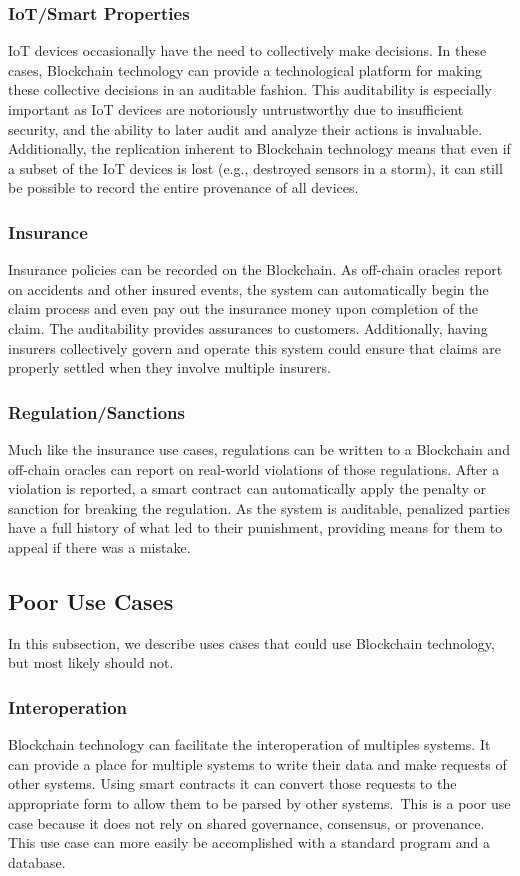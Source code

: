 \subsubsection{IoT/Smart Properties}
IoT devices occasionally have the need to collectively make decisions.
In these cases, Blockchain technology can provide a technological platform for making these collective decisions in an auditable fashion.
This auditability is especially important as IoT devices are notoriously untrustworthy due to insufficient security, and the ability to later audit and analyze their actions is invaluable.
Additionally, the replication inherent to Blockchain technology means that even if a subset of the IoT devices is lost (e.g., destroyed sensors in a storm), it can still be possible to record the entire provenance of all devices.

\subsubsection{Insurance}
Insurance policies can be recorded on the Blockchain.
As off-chain oracles report on accidents and other insured events, the system can automatically begin the claim process and even pay out the insurance money upon completion of the claim.
The auditability provides assurances to customers.
Additionally, having insurers collectively govern and operate this system could ensure that claims are properly settled when they involve multiple insurers.

\subsubsection{Regulation/Sanctions}
Much like the insurance use cases, regulations can be written to a Blockchain and off-chain oracles can report on real-world violations of those regulations.
After a violation is reported, a smart contract can automatically apply the penalty or sanction for breaking the regulation.
As the system is auditable, penalized parties have a full history of what led to their punishment, providing means for them to appeal if there was a mistake.

\subsection{Poor Use Cases}
In this subsection, we describe uses cases that could use Blockchain technology, but most likely should not.

\subsubsection{Interoperation}
Blockchain technology can facilitate the interoperation of multiples systems.
It can provide a place for multiple systems to write their data and make requests of other systems.
Using smart contracts it can convert those requests to the appropriate form to allow them to be parsed by other systems.\
This is a poor use case because it does not rely on shared governance, consensus, or provenance.
This use case can more easily be accomplished with a standard program and a database.

